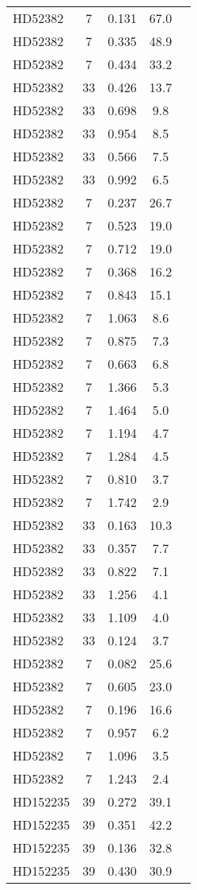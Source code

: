 \begin{table*}
\begin{tabular}{l c c c c}
HD52382 & 7 & 0.131 & 67.0\\ 
HD52382 & 7 & 0.335 & 48.9\\ 
HD52382 & 7 & 0.434 & 33.2\\ 
HD52382 & 33 & 0.426 & 13.7\\ 
HD52382 & 33 & 0.698 & 9.8\\ 
HD52382 & 33 & 0.954 & 8.5\\ 
HD52382 & 33 & 0.566 & 7.5\\ 
HD52382 & 33 & 0.992 & 6.5\\ 
HD52382 & 7 & 0.237 & 26.7\\ 
HD52382 & 7 & 0.523 & 19.0\\ 
HD52382 & 7 & 0.712 & 19.0\\ 
HD52382 & 7 & 0.368 & 16.2\\ 
HD52382 & 7 & 0.843 & 15.1\\ 
HD52382 & 7 & 1.063 & 8.6\\ 
HD52382 & 7 & 0.875 & 7.3\\ 
HD52382 & 7 & 0.663 & 6.8\\ 
HD52382 & 7 & 1.366 & 5.3\\ 
HD52382 & 7 & 1.464 & 5.0\\ 
HD52382 & 7 & 1.194 & 4.7\\ 
HD52382 & 7 & 1.284 & 4.5\\ 
HD52382 & 7 & 0.810 & 3.7\\ 
HD52382 & 7 & 1.742 & 2.9\\ 
HD52382 & 33 & 0.163 & 10.3\\ 
HD52382 & 33 & 0.357 & 7.7\\ 
HD52382 & 33 & 0.822 & 7.1\\ 
HD52382 & 33 & 1.256 & 4.1\\ 
HD52382 & 33 & 1.109 & 4.0\\ 
HD52382 & 33 & 0.124 & 3.7\\ 
HD52382 & 7 & 0.082 & 25.6\\ 
HD52382 & 7 & 0.605 & 23.0\\ 
HD52382 & 7 & 0.196 & 16.6\\ 
HD52382 & 7 & 0.957 & 6.2\\ 
HD52382 & 7 & 1.096 & 3.5\\ 
HD52382 & 7 & 1.243 & 2.4\\ 
\hline
HD152235 & 39 & 0.272 & 39.1\\ 
HD152235 & 39 & 0.351 & 42.2\\ 
HD152235 & 39 & 0.136 & 32.8\\ 
HD152235 & 39 & 0.430 & 30.9\\ 

\end{tabular}
\end{table*}
